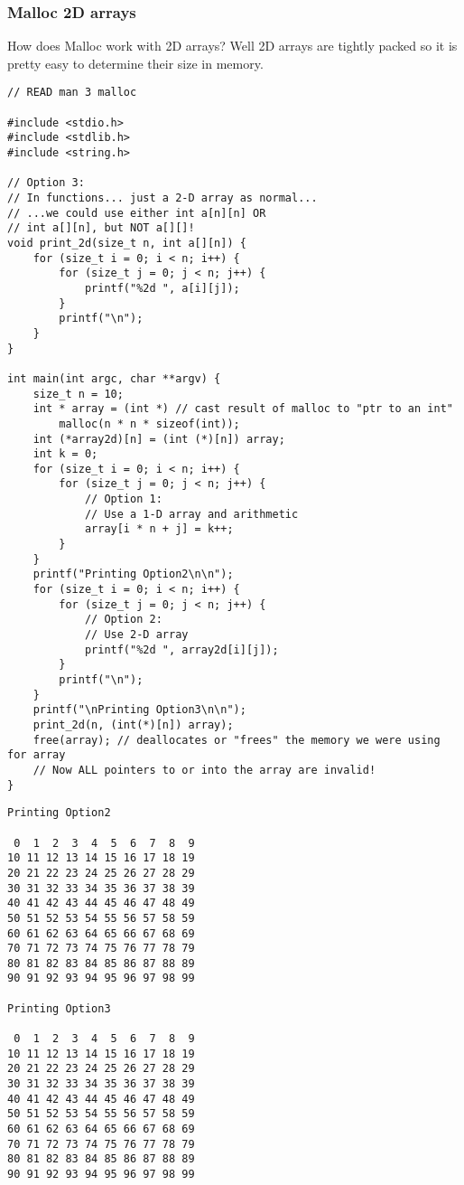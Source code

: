 \documentclass[11pt]{article}
\begin{document}
\subsubsection{Malloc 2D arrays}
\label{sec:org5de8d0d}

How does Malloc work with 2D arrays? Well 2D arrays are tightly packed
so it is pretty easy to determine their size in memory.

\begin{verbatim}
// READ man 3 malloc

#include <stdio.h>
#include <stdlib.h>
#include <string.h>

// Option 3:
// In functions... just a 2-D array as normal...
// ...we could use either int a[n][n] OR
// int a[][n], but NOT a[][]!
void print_2d(size_t n, int a[][n]) {
    for (size_t i = 0; i < n; i++) {
        for (size_t j = 0; j < n; j++) {
            printf("%2d ", a[i][j]);
        }
        printf("\n");
    }
}

int main(int argc, char **argv) {
    size_t n = 10;
    int * array = (int *) // cast result of malloc to "ptr to an int"
        malloc(n * n * sizeof(int));
    int (*array2d)[n] = (int (*)[n]) array;
    int k = 0;
    for (size_t i = 0; i < n; i++) {
        for (size_t j = 0; j < n; j++) {
            // Option 1:
            // Use a 1-D array and arithmetic
            array[i * n + j] = k++;
        }
    }
    printf("Printing Option2\n\n");
    for (size_t i = 0; i < n; i++) {
        for (size_t j = 0; j < n; j++) {
            // Option 2:
            // Use 2-D array
            printf("%2d ", array2d[i][j]);
        }
        printf("\n");
    }
    printf("\nPrinting Option3\n\n");
    print_2d(n, (int(*)[n]) array);
    free(array); // deallocates or "frees" the memory we were using for array
    // Now ALL pointers to or into the array are invalid!
}
\end{verbatim}

\begin{verbatim}
Printing Option2

 0  1  2  3  4  5  6  7  8  9 
10 11 12 13 14 15 16 17 18 19 
20 21 22 23 24 25 26 27 28 29 
30 31 32 33 34 35 36 37 38 39 
40 41 42 43 44 45 46 47 48 49 
50 51 52 53 54 55 56 57 58 59 
60 61 62 63 64 65 66 67 68 69 
70 71 72 73 74 75 76 77 78 79 
80 81 82 83 84 85 86 87 88 89 
90 91 92 93 94 95 96 97 98 99 

Printing Option3

 0  1  2  3  4  5  6  7  8  9 
10 11 12 13 14 15 16 17 18 19 
20 21 22 23 24 25 26 27 28 29 
30 31 32 33 34 35 36 37 38 39 
40 41 42 43 44 45 46 47 48 49 
50 51 52 53 54 55 56 57 58 59 
60 61 62 63 64 65 66 67 68 69 
70 71 72 73 74 75 76 77 78 79 
80 81 82 83 84 85 86 87 88 89 
90 91 92 93 94 95 96 97 98 99
\end{verbatim}
\end{document}
